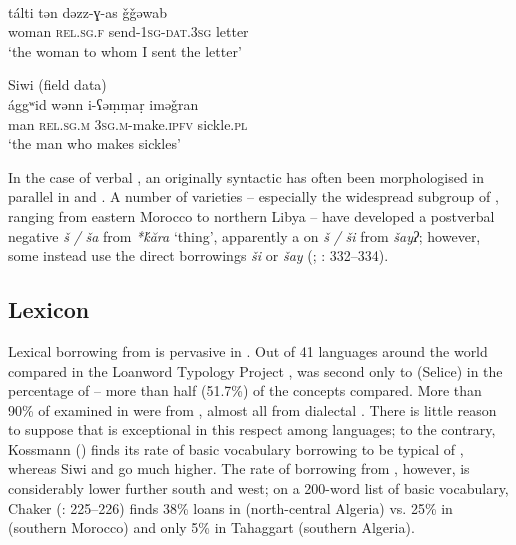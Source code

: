 \documentclass[output=paper]{langsci/langscibook}
\begin{document}
\ea
{}\\
\gll tálti tən dəzz-ɣ{}-as ǧǧəwab\\
woman \textsc{rel.sg.f} send-\textsc{1sg-dat.3sg} letter\\
\glt `the woman to whom I sent the letter' \\
     \z
     
\ea
{ Siwi (field data)}\\
\gll ággʷid wənn i-ʕəṃṃaṛ iməǧran\\
man \textsc{rel.sg.m} \textsc{3sg.m}{}-make.\textsc{ipfv} sickle.\textsc{pl}\\
\glt `the man who makes sickles' 
\z

In the case of verbal , an originally syntactic  has often been morphologised in parallel in  and . A number of varieties – especially the widespread  subgroup of , ranging from eastern Morocco to northern Libya – have developed a postverbal negative  \textit{š} \textit{/} \textit{ša} from \textit{*\'{k}ăra} `thing', apparently a  on  \textit{š} \textit{/} \textit{ši} from \textit{šayʔ}; however, some instead use the direct borrowings \textit{ši} or \textit{šay} (\citealt{Lucas2007}; \citealt{Kossmann2013book}: 332–334).


 
 \subsection{Lexicon}


Lexical borrowing from  is pervasive in . Out of 41 languages around the world compared in the Loanword Typology Project \citep{Tadmor2009},   was second only to (Selice)  in the percentage of  – more than half (51.7\%) of the concepts compared. More than 90\% of  examined in  were from , almost all from dialectal  .  There is little reason to suppose that  is exceptional in this respect among   languages; to the contrary, Kossmann (\citeyear[110]{Kossmann2013book}) finds its rate of basic vocabulary borrowing to be typical of  , whereas Siwi and  go much higher. The rate of borrowing from , however, is considerably lower further south and west; on a 200-word list of basic vocabulary, Chaker (\citeyear{Chaker1984}: 225–226) finds 38\%  loans in  (north-central Algeria) vs. 25\% in  (southern Morocco) and only 5\% in Tahaggart  (southern Algeria).
\end{document}
